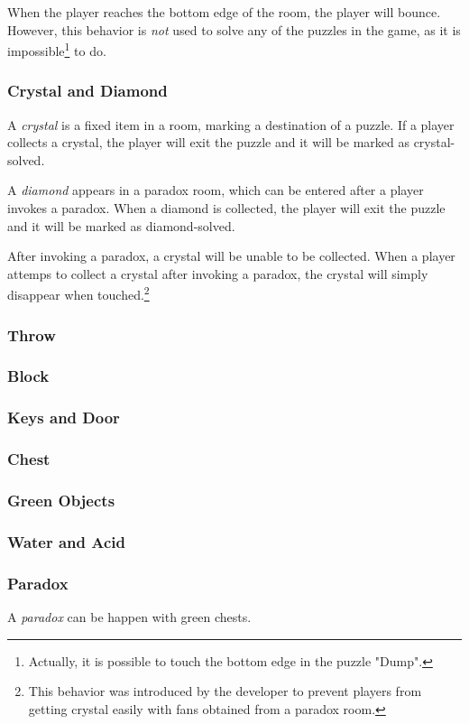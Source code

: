 \documentclass[a4paper]{article}
\theoremstyle{theorem}
\theoremstyle{definition}
\begin{document}
When the player reaches the bottom edge of the room, the player will bounce.
However, this behavior is \emph{not} used to solve any of the puzzles in the game,
as it is impossible\footnote{Actually, it is possible to touch the bottom edge in the puzzle "Dump".} to do.
\subsubsection{Crystal and Diamond}
A \emph{crystal} is a fixed item in a room, marking a destination of a puzzle. If a player
collects a crystal, the player will exit the puzzle and it will be marked as crystal-solved.

A \emph{diamond} appears in a paradox room, which can be entered after a player invokes a paradox.
When a diamond is collected, the player will exit the puzzle and it will be marked as diamond-solved.

After invoking a paradox, a crystal will be unable to be collected. When a player attemps to collect a crystal
after invoking a paradox, the crystal will simply disappear when touched.\footnote{This behavior was introduced
by the developer to prevent players from getting crystal easily with fans obtained from a paradox room.}
\subsubsection{Throw}
\subsubsection{Block}
\subsubsection{Keys and Door}
\subsubsection{Chest}
\subsubsection{Green Objects}
\subsubsection{Water and Acid}
\subsubsection{Paradox}
A \emph{paradox} can be happen with green chests.
\end{document}
